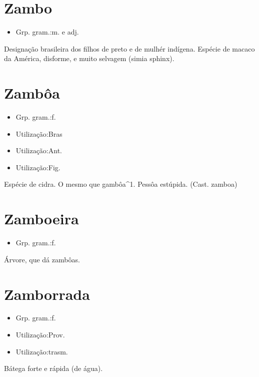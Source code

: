 \section{Zambo}
\begin{itemize}
\item {Grp. gram.:m.  e  adj.}
\end{itemize}
Designação brasileira dos filhos de preto e de mulhér indígena.
Espécie de macaco da América, disforme, e muito selvagem (\textunderscore simia sphinx\textunderscore ).
\section{Zambôa}
\begin{itemize}
\item {Grp. gram.:f.}
\end{itemize}
\begin{itemize}
\item {Utilização:Bras}
\end{itemize}
\begin{itemize}
\item {Utilização:Ant.}
\end{itemize}
\begin{itemize}
\item {Utilização:Fig.}
\end{itemize}
Espécie de cidra.
O mesmo que \textunderscore gambôa\textunderscore ^1.
Pessôa estúpida.
(Cast. \textunderscore zamboa\textunderscore )
\section{Zamboeira}
\begin{itemize}
\item {Grp. gram.:f.}
\end{itemize}
Árvore, que dá zambôas.
\section{Zamborrada}
\begin{itemize}
\item {Grp. gram.:f.}
\end{itemize}
\begin{itemize}
\item {Utilização:Prov.}
\end{itemize}
\begin{itemize}
\item {Utilização:trasm.}
\end{itemize}
Bátega forte e rápida (de água).
